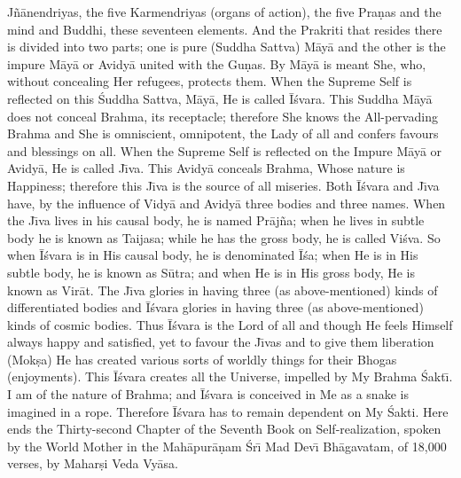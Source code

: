 J\~n\=anendriyas, the five Karmendriyas (organs of action), the five Pra\d{n}as and the mind and Buddhi, these seventeen elements. And the Prakriti that resides there is divided into two parts; one is pure (Suddha Sattva) M\=ay\=a and the other is the impure M\=ay\=a or Avidy\=a united with the Gu\d{n}as. By M\=ay\=a is meant She, who, without concealing Her refugees, protects them. When the Supreme Self is reflected on this \'Suddha Sattva, M\=ay\=a, He is called \=I\'svara. This Suddha M\=ay\=a does not conceal Brahma, its receptacle; therefore She knows the All-pervading Brahma and She is omniscient, omnipotent, the Lady of all and confers favours and blessings on all. When the Supreme Self is reflected on the Impure M\=ay\=a or Avidy\=a, He is called J\={\i}va. This Avidy\=a conceals Brahma, Whose nature is Happiness; therefore this J\={\i}va is the source of all miseries. Both \=I\'svara and J\={\i}va have, by the influence of Vidy\=a and Avidy\=a three bodies and three names. When the J\={\i}va lives in his causal body, he is named Pr\=aj\~na; when he lives in subtle body he is known as Taijasa; while he has the gross body, he is called Vi\'sva. So when \=I\'svara is in His causal body, he is denominated \=I\'sa; when He is in His subtle body, he is known as S\=utra; and when He is in His gross body, He is known as Vir\=at.
The J\={\i}va glories in having three (as above-mentioned) kinds of differentiated bodies and \=I\'svara glories in having three (as above-mentioned) kinds of cosmic bodies. Thus \=I\'svara is the Lord of all and though He feels Himself always happy and satisfied, yet to favour the J\={\i}vas and to give them liberation (Mok\d{s}a) He has created various sorts of worldly things for their Bhogas (enjoyments). This \=I\'svara creates all the Universe, impelled by My Brahma \'Sakt\={\i}. I am of the nature of Brahma; and \=I\'svara is conceived in Me as a snake is imagined in a rope. Therefore \=I\'svara has to remain dependent on My \'Sakti.
Here ends the Thirty-second Chapter of the Seventh Book on Self-realization, spoken by the World Mother in the Mah\=apur\=a\d{n}am \'Sr\={\i} Mad Dev\={\i} Bh\=agavatam, of 18,000 verses, by Mahar\d{s}i Veda Vy\=asa.



